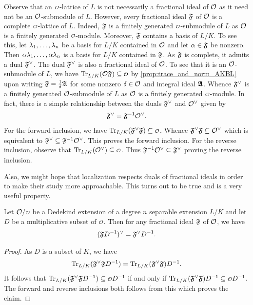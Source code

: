     Observe that an \(\smc{O}\)-lattice of \(L\) is not necessarily a fractional ideal of \(\mathcal{O}\) as it need not be an \(\mathcal{O}\)-submodule of \(L\). However, every fractional ideal \(\mathfrak{F}\) of \(\mathcal{O}\) is a complete \(\smc{O}\)-lattice of \(L\). Indeed, \(\mathfrak{F}\) is a finitely generated \(\smc{O}\)-submodule of \(L\) as \(\mathcal{O}\) is a finitely generated \(\smc{O}\)-module. Moreover, \(\mathfrak{F}\) contains a basis of \(L/K\). To see this, let \(\lambda_{1},\ldots,\lambda_{n}\) be a basis for \(L/K\) contained in \(\mathcal{O}\) and let \(\alpha \in \mathfrak{F}\) be nonzero. Then \(\alpha\lambda_{1},\ldots,\alpha\lambda_{n}\) is a basis for \(L/K\) contained in \(\mathfrak{F}\). As \(\mathfrak{F}\) is complete, it admits a dual \(\mathfrak{F}^{\vee}\). The dual \(\mathfrak{F}^{\vee}\) is also a fractional ideal of \(\mathcal{O}\). To see that it is an \(\mathcal{O}\)-submodule of \(L\), we have \(\Trace_{L/K}(\mc{O}\mf{F}) \subseteq \smc{O}\) by \cref{prop:trace_and_norm_AKBL} upon writing \(\mathfrak{F} = \frac{1}{\delta}\mathfrak{A}\) for some nonzero \(\delta \in \mathcal{O}\) and integral ideal \(\mathfrak{A}\). Whence \(\mathfrak{F}^{\vee}\) is a finitely generated \(\mathcal{O}\)-submodule of \(L\) as \(\mathcal{O}\) is a finitely generated \(\smc{O}\)-module. In fact, there is a simple relationship between the duals \(\mathfrak{F}^{\vee}\) and \(\mathcal{O}^{\vee}\) given by
    \[
      \mathfrak{F}^{\vee} = \mathfrak{F}^{-1}\mathcal{O}^{\vee}.
    \]
    For the forward inclusion, we have \(\Trace_{L/K}(\mf{F}^{\vee}\mf{F}) \subseteq \smc{O}\). Whence \(\mathfrak{F}^{\vee}\mathfrak{F} \subseteq \mathcal{O}^{\vee}\) which is equivalent to \(\mathfrak{F}^{\vee} \subseteq \mathfrak{F}^{-1}\mathcal{O}^{\vee}\). This proves the forward inclusion. For the reverse inclusion, observe that \(\Trace_{L/K}(\mc{O}^{\vee}) \subseteq \smc{O}\). Thus \(\mathfrak{F}^{-1}\mathcal{O}^{\vee} \subseteq \mathfrak{F}^{\vee}\) proving the reverse inclusion.

    Also, we might hope that localization respects duals of fractional ideals in order to make their study more approachable. This turns out to be true and is a very useful property.
    
    \begin{proposition}\label{prop:dual_of_localization_is_localization_of_dual}
      Let \(\mc{O}/\smc{O}\) be a Dedekind extension of a degree \(n\) separable extension \(L/K\) and let \(D\) be a multiplicative subset of \(\smc{O}\). Then for any fractional ideal \(\mathfrak{F}\) of \(\mathcal{O}\), we have
      \[
        (\mathfrak{F}D^{-1})^{\vee} = \mathfrak{F}^{\vee}D^{-1}.
      \]
    \end{proposition}
    \begin{proof}
      As \(D\) is a subset of \(K\), we have
      \[
        \operatorname{\mathrm{Tr}}_{L/K}(\mathfrak{F}^{\vee}\mathfrak{F}D^{-1}) = \operatorname{\mathrm{Tr}}_{L/K}(\mathfrak{F}^{\vee}\mathfrak{F})D^{-1}.
      \]
      It follows that \(\Trace_{L/K}(\mf{F}^{\vee}\mf{F}D^{-1}) \subseteq \smc{O}D^{-1}\) if and only if \(\Trace_{L/K}(\mf{F}^{\vee}\mf{F})D^{-1} \subseteq \smc{O}D^{-1}\). The forward and reverse inclusions both follows from this which proves the claim.
    \end{proof}

